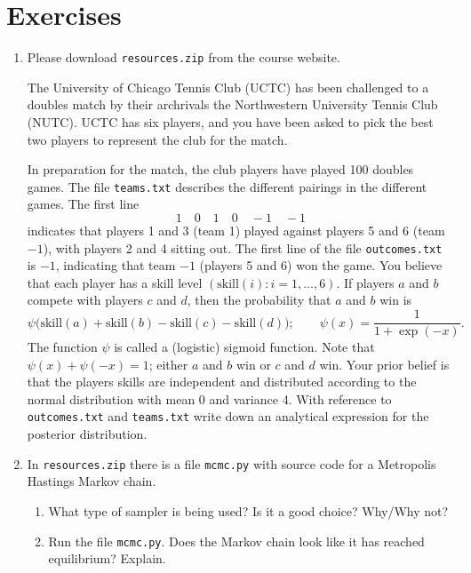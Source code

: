 
\section{Exercises}
\label{sec:4.5}

\begin{enumerate}

\item[4.1] Please download \texttt{resources.zip} from the course website.

The University of Chicago Tennis Club (UCTC) has been challenged to a doubles match by
their archrivals the Northwestern University Tennis Club (NUTC). UCTC has six players, and
you have been asked to pick the best two players to represent the club for the match.

In preparation for the match, the club players have played 100 doubles games. The file
\texttt{teams.txt} describes the different pairings in the different games. The first line
\[
  1 \quad 0 \quad 1 \quad 0 \quad -1 \quad -1
\]
indicates that players 1 and 3 (team 1) played against players 5 and 6 (team $-1$), with players 2
and 4 sitting out. The first line of the file \texttt{outcomes.txt} is $-1$, indicating that team $-1$ (players 5
and 6) won the game. You believe that each player has a skill level $(\mathrm{skill}(i) : i = 1, \ldots, 6)$. If
players $a$ and $b$ compete with players $c$ and $d$, then the probability that $a$ and $b$ win is
\[
  \psi\!\bigl(\mathrm{skill}(a) + \mathrm{skill}(b) - \mathrm{skill}(c) - \mathrm{skill}(d)\bigr);
  \qquad
  \psi(x) = \frac{1}{1 + \exp(-x)}.
\]
The function $\psi$ is called a (logistic) sigmoid function. Note that $\psi(x) + \psi(-x) = 1$; either $a$ and
$b$ win or $c$ and $d$ win. Your prior belief is that the players skills are independent and distributed
according to the normal distribution with mean 0 and variance 4. With reference to \texttt{outcomes.txt}
and \texttt{teams.txt} write down an analytical expression for the posterior distribution.

\item[4.2] In \texttt{resources.zip} there is a file \texttt{mcmc.py} with source code for a Metropolis
Hastings Markov chain.

\begin{enumerate}
\item What type of sampler is being used? Is it a good choice? Why/Why not?

\item Run the file \texttt{mcmc.py}. Does the Markov chain look like it has reached equilibrium? Explain.


\end{enumerate}
\end{enumerate}
